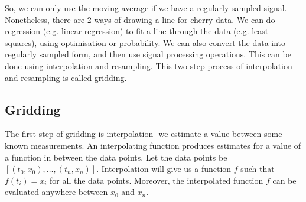 \documentclass[a4paper, openany]{memoir}
\begin{document}
So, we can only use the moving average if we have a regularly sampled signal. Nonetheless, there are 2 ways of drawing a line for cherry data. We can do regression (e.g. linear regression) to fit a line through the data (e.g. least squares), using optimisation or probability. We can also convert the data into regularly sampled form, and then use signal processing operations. This can be done using interpolation and resampling. This two-step process of interpolation and resampling is called gridding.

\subsection{Gridding}
The first step of gridding is interpolation- we estimate a value between some known measurements. An interpolating function produces estimates for a value of a function in between the data points. Let the data points be $[(t_0, x_0), \dots, (t_n, x_n)]$. Interpolation will give us a function $f$ such that $f(t_i) = x_i$ for all the data points. Moreover, the interpolated function $f$ can be evaluated anywhere between $x_0$ and $x_n$.
\end{document}
